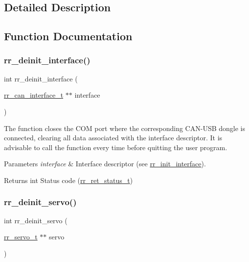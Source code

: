 \subsection{Detailed Description}


\subsection{Function Documentation}
\mbox{\label{group___common_ga10cbfcf4b80ebfd0d4df74441bbbe91a}} 
\subsubsection{\texorpdfstring{rr\+\_\+deinit\+\_\+interface()}{rr\_deinit\_interface()}}
{\footnotesize\ttfamily int rr\+\_\+deinit\+\_\+interface (\begin{DoxyParamCaption}\item[{\hyperlink{structrr__can__interface__t}{rr\+\_\+can\+\_\+interface\+\_\+t} $\ast$$\ast$}]{interface }\end{DoxyParamCaption})}



The function closes the C\+OM port where the corresponding C\+A\+N-\/\+U\+SB dongle is connected, clearing all data associated with the interface descriptor. It is advisable to call the function every time before quitting the user program. 


\begin{DoxyParams}{Parameters}
{\em interface} & Interface descriptor (see \hyperlink{group___common_ga472a4890dcc7d7a13123c56a06946d91}{rr\+\_\+init\+\_\+interface}). \\
\hline
\end{DoxyParams}
\begin{DoxyReturn}{Returns}
int Status code (\hyperlink{api_8h_a92d5be5038abcf89837faf85a08debdc}{rr\+\_\+ret\+\_\+status\+\_\+t}) 
\end{DoxyReturn}
\mbox{\label{group___common_gafebc52982ef705b8d0f805d5ee5ca9f7}} 
\subsubsection{\texorpdfstring{rr\+\_\+deinit\+\_\+servo()}{rr\_deinit\_servo()}}
{\footnotesize\ttfamily int rr\+\_\+deinit\+\_\+servo (\begin{DoxyParamCaption}\item[{\hyperlink{structrr__servo__t}{rr\+\_\+servo\+\_\+t} $\ast$$\ast$}]{servo }\end{DoxyParamCaption})}



